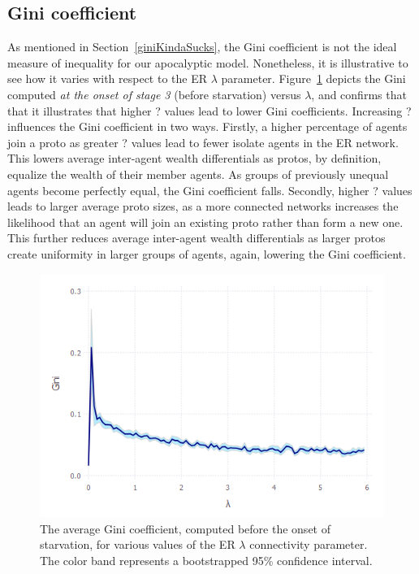 \subsection{Gini coefficient}

As mentioned in Section~\ref{giniKindaSucks}, the Gini coefficient is not the
ideal measure of inequality for our apocalyptic model. Nonetheless, it is
illustrative to see how it varies with respect to the ER $\lambda$ parameter.
Figure~\ref{fig:giniVsLambda} depicts the Gini computed \textit{at the onset
of stage 3} (before starvation) versus $\lambda$, and confirms that that it illustrates that higher ? values lead to lower Gini coefficients. Increasing ? influences the Gini coefficient in two ways. Firstly, a higher percentage of agents join a proto as greater ? values lead to fewer isolate agents in the ER network. This lowers average inter-agent wealth differentials as protos, by definition, equalize the wealth of their member agents. As groups of previously unequal agents become perfectly equal, the Gini coefficient falls. Secondly, higher ? values leads to larger average proto sizes, as a more connected networks increases the likelihood that an agent will join an existing proto rather than form a new one. This further reduces average inter-agent wealth differentials as larger protos create uniformity in larger groups of agents, again, lowering the Gini coefficient.

\begin{figure}[hb]
\centering
\includegraphics[width=\columnwidth]{figures/giniVsLambda.png}
\caption{The average Gini coefficient, computed before the onset of starvation,
for various values of the ER $\lambda$ connectivity parameter. The color band
represents a bootstrapped 95\% confidence interval.}
\label{fig:giniVsLambda}
\end{figure}

